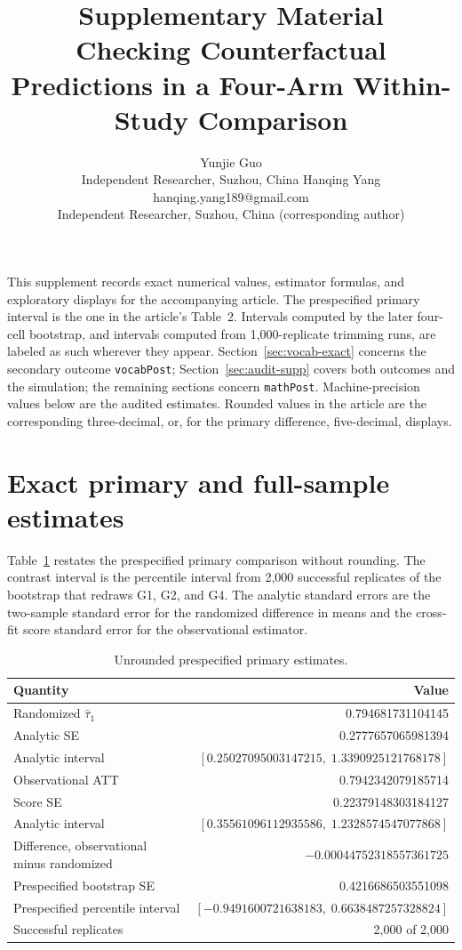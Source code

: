 \documentclass[twoside,11pt]{article}
\title{Supplementary Material\\
Checking Counterfactual Predictions in a Four-Arm Within-Study Comparison}
\author{\name Yunjie Guo \\
  \addr Independent Researcher, Suzhou, China
  \AND \name Hanqing Yang \email hanqing.yang189@gmail.com \\
  \addr Independent Researcher, Suzhou, China (corresponding author)}
\date{}
\begin{document}
\maketitle
\thispagestyle{plain}

\noindent
This supplement records exact numerical values, estimator formulas, and exploratory displays for the accompanying article. The prespecified primary interval is the one in the article's Table~2. Intervals computed by the later four-cell bootstrap, and intervals computed from 1{,}000-replicate trimming runs, are labeled as such wherever they appear. Section~\ref{sec:vocab-exact} concerns the secondary outcome \texttt{vocabPost}; Section~\ref{sec:audit-supp} covers both outcomes and the simulation; the remaining sections concern \texttt{mathPost}. Machine-precision values below are the audited estimates. Rounded values in the article are the corresponding three-decimal, or, for the primary difference, five-decimal, displays.

\section{Exact primary and full-sample estimates}
\label{sec:exact}

Table~\ref{tab:exact-primary} restates the prespecified primary comparison without rounding. The contrast interval is the percentile interval from 2{,}000 successful replicates of the bootstrap that redraws G1, G2, and G4. The analytic standard errors are the two-sample standard error for the randomized difference in means and the cross-fit score standard error for the observational estimator.

\begin{table}[ht]
\centering
\caption{Unrounded prespecified primary estimates.}
\label{tab:exact-primary}
\small
\begin{tabular}{lr}
\toprule
Quantity & Value \\
\midrule
Randomized $\widehat\tau_1$ & 0.794681731104145 \\
Analytic SE & 0.2777657065981394 \\
Analytic interval & $[0.25027095003147215,\; 1.3390925121768178]$ \\
Observational ATT & 0.7942342079185714 \\
Score SE & 0.22379148303184127 \\
Analytic interval & $[0.35561096112935586,\; 1.2328574547077868]$ \\
Difference, observational minus randomized & $-0.00044752318557361725$ \\
Prespecified bootstrap SE & 0.4216686503551098 \\
Prespecified percentile interval & $[-0.9491600721638183,\; 0.6638487257328824]$ \\
Successful replicates & 2{,}000 of 2{,}000 \\
\bottomrule
\end{tabular}
\end{table}
\end{document}
